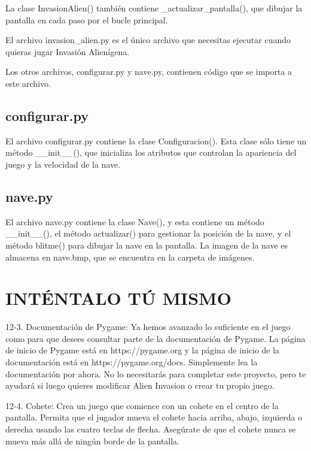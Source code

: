 La clase {\ttfamily InvasionAlien()} también contiene {\ttfamily \_actualizar\_pantalla()}, que  dibujar la pantalla en cada paso por el bucle principal.

El archivo {\ttfamily invasion\_alien.py} es el único archivo que necesitas ejecutar cuando quieras jugar {\ttfamily Invasión Alienígena}. 

Los otros archivos, {\ttfamily configurar.py} y {\ttfamily nave.py}, contienen código que se importa a este archivo.

\subsection{configurar.py}

El archivo {\ttfamily configurar.py} contiene la clase {\ttfamily Configuracion()}. Esta clase sólo tiene un método {\ttfamily\_\_init\_\_()}, que inicializa los atributos que controlan la apariencia del juego y la velocidad de la nave.
	
\subsection{nave.py}

El archivo  {\ttfamily nave.py} contiene la clase  {\ttfamily Nave()}, y esta contiene un método {\ttfamily\_\_init\_\_()}, el método   {\ttfamily actualizar()} para gestionar la posición de la nave,  y  el método {\ttfamily  blitme()} para dibujar la nave en la pantalla. La imagen de la nave es almacena en {\ttfamily nave.bmp}, que se encuentra en la carpeta de imágenes.


\section{INTÉNTALO TÚ MISMO}

12-3. Documentación de Pygame: 
Ya hemos avanzado lo suficiente en el juego como para que desees consultar parte de la documentación de Pygame. 
La página de inicio de Pygame está en https://pygame.org y la página de inicio de la documentación está en https://pygame.org/docs. Simplemente lea la documentación por ahora. No lo necesitarás para completar este proyecto, pero te ayudará si luego quieres modificar Alien Invasion o crear tu propio juego.

12-4. Cohete: 
Crea un juego que comience con un cohete en el centro de la pantalla. Permita que el jugador mueva el cohete hacia arriba, abajo, izquierda o derecha usando las cuatro teclas de flecha. Asegúrate de que el cohete nunca se mueva más allá de ningún borde de la pantalla.


